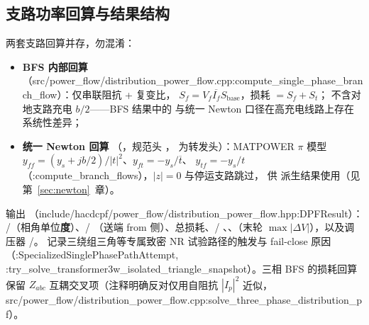 \subsection{支路功率回算与结果结构}
两套支路回算并存，勿混淆：
\begin{itemize}
  \item \textbf{BFS 内部回算} 
        （src/power\_flow/distribution\_power\_flow.cpp:compute\_single\_phase\_branch\_flow）：仅串联阻抗 + 复变比，
        $S_f=V_f\overline{I_f}S_{\mathrm{base}}$，损耗 $=S_f+S_t$；
        不含对地支路充电 $b/2$——BFS 结果中的  与统一
        Newton 口径在高充电线路上存在系统性差异；
  \item \textbf{统一 Newton 回算} 
        （，规范头
        ，
         为转发头）：MATPOWER $\pi$ 模型
        $y_{ff}=(y_s+jb/2)/|t|^2$、$y_{ft}=-y_s/\overline{t}$、
        $y_{tf}=-y_s/t$（:compute\_branch\_flows），$|z|=0$ 与停运支路跳过，
        供  派生结果使用（见第~\ref{sec:newton}~章）。
\end{itemize}
输出 （include/hacdcpf/power\_flow/distribution\_power\_flow.hpp:DPFResult）：
/（相角单位\textbf{度}）、/
（送端 from 侧）、总损耗、/
、、（末轮
$\max|\Delta V|$），以及调压器 /。
 记录三绕组三角等专属致密 NR 试验路径的触发与
fail-close 原因（:SpecializedSinglePhasePathAttempt, :try\_solve\_transformer3w\_isolated\_triangle\_snapshot）。三相 BFS 的损耗回算保留
$Z_{abc}$ 互耦交叉项（注释明确反对仅用自阻抗 $|I_p|^2$ 近似，
src/power\_flow/distribution\_power\_flow.cpp:solve\_three\_phase\_distribution\_pf）。

